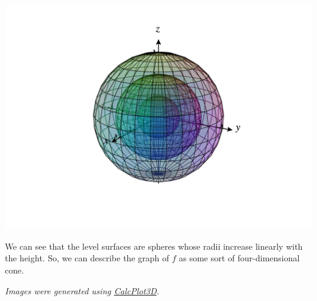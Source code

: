 \documentclass{ximera}
\begin{document}
\begin{example}
\begin{image}
\includegraphics[width = \textwidth]{CalcPlot3D-nested_level_surfaces}
\end{image}

We can see that the level surfaces are spheres whose radii increase linearly with the height. So, we can describe the graph of $f$ as some sort of four-dimensional cone.

\end{example}

\textit{Images were generated using \href{https://www.monroecc.edu/faculty/paulseeburger/calcnsf/CalcPlot3D/}{CalcPlot3D}.}
\end{document}
